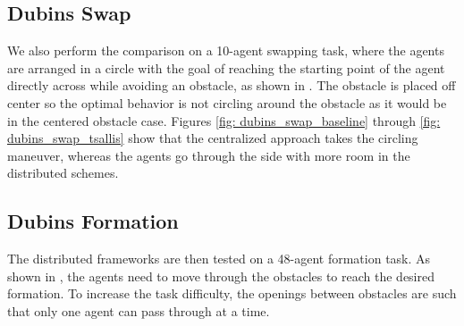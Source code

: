 \documentclass[twoside,11pt]{article}
\begin{document}
\subsection{Dubins Swap}

We also perform the comparison on a 10-agent swapping task, where the agents are arranged in a circle with the goal of reaching the starting point of the agent directly across while avoiding an obstacle, as shown in . The obstacle is placed off center so the optimal behavior is not circling around the obstacle as it would be in the centered obstacle case. Figures \ref{fig: dubins_swap_baseline} through \ref{fig: dubins_swap_tsallis} show that the centralized approach takes the circling maneuver, whereas the agents go through the side with more room in the distributed schemes. 


\subsection{Dubins Formation}

The distributed frameworks are then tested on a 48-agent formation task. As shown in , the agents need to move through the obstacles to reach the desired formation. To increase the task difficulty, the openings between obstacles are such that only one agent can pass through at a time. 


\end{document}
